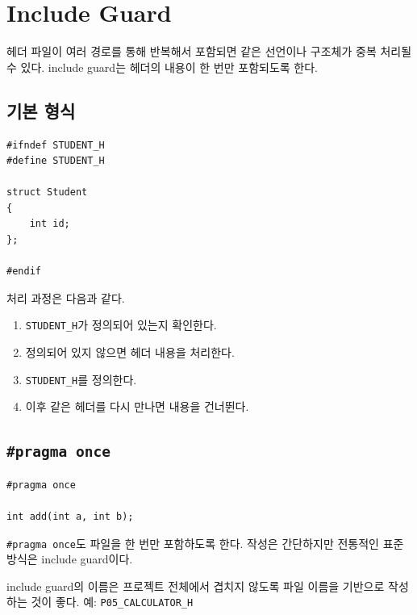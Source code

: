 \documentclass[11pt,a4paper]{article}
\begin{document}
\section{Include Guard}

헤더 파일이 여러 경로를 통해 반복해서 포함되면 같은 선언이나 구조체가 중복 처리될 수 있다.
include guard는 헤더의 내용이 한 번만 포함되도록 한다.

\subsection{기본 형식}

\begin{lstlisting}
#ifndef STUDENT_H
#define STUDENT_H

struct Student
{
    int id;
};

#endif
\end{lstlisting}

처리 과정은 다음과 같다.

\begin{enumerate}
    \item \texttt{STUDENT\_H}가 정의되어 있는지 확인한다.
    \item 정의되어 있지 않으면 헤더 내용을 처리한다.
    \item \texttt{STUDENT\_H}를 정의한다.
    \item 이후 같은 헤더를 다시 만나면 내용을 건너뛴다.
\end{enumerate}

\subsection{\texttt{\#pragma once}}

\begin{lstlisting}
#pragma once

int add(int a, int b);
\end{lstlisting}

\texttt{\#pragma once}도 파일을 한 번만 포함하도록 한다.
작성은 간단하지만 전통적인 표준 방식은 include guard이다.

\begin{importantbox}
include guard의 이름은 프로젝트 전체에서 겹치지 않도록 파일 이름을 기반으로 작성하는 것이 좋다.
예: \texttt{P05\_CALCULATOR\_H}
\end{importantbox}

\end{document}

